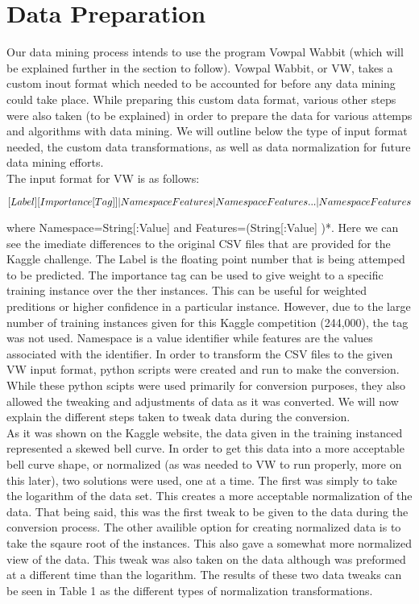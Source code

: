 \section{Data Preparation}

Our data mining process intends to use the program Vowpal Wabbit (which will be explained further in the section to follow). Vowpal Wabbit,
or VW, takes a custom inout format which needed to be accounted for before any data mining could take place. While preparing this custom
data format, various other steps were also taken (to be explained) in order to prepare the data for various attemps and algorithms with
data mining. We will outline below the type of input format needed, the custom data transformations, as well as data normalization for
future data mining efforts.\\

The input format for VW is as follows:

\begin{equation}
\label{eq:input}
\tiny
[Label][Importance [Tag]]|Namespace Features|Namespace Features...|Namespace Features
\end{equation}

where Namespace=String[:Value] and Features=(String[:Value] )*. Here we can see the imediate differences to the original CSV files that
are provided for the Kaggle challenge. The Label is the floating point number that is being attemped to be predicted. The importance
tag can be used to give weight to a specific training instance over the ther instances. This can be useful for weighted preditions
or higher confidence in a particular instance. However, due to the large number of training instances given for this Kaggle competition
(244,000), the tag was not used. Namespace is a value identifier while features are the values associated with the identifier.
In order to transform the CSV files to the given VW input format, python scripts were created and run to make the conversion. While
these python scipts were used primarily for conversion purposes, they also allowed the tweaking and adjustments of data as it was converted.
We will now explain the different steps taken to tweak data during the conversion.\\

As it was shown on the Kaggle website, the data given in the training instanced represented a skewed bell curve. In order to get
this data into a more acceptable bell curve shape, or normalized (as was needed to VW to run properly, more on this later), two
solutions were used, one at a time. The first was simply to take the logarithm of the data set. This creates a more acceptable
normalization of the data. That being said, this was the first tweak to be given to the data during the conversion process. The other
availible option for creating normalized data is to take the sqaure root of the instances. This also gave a somewhat more normalized
view of the data. This tweak was also taken on the data although was preformed at a different time than the logarithm. The results
of these two data tweaks can be seen in Table 1 as the different types of normalization transformations.\\

